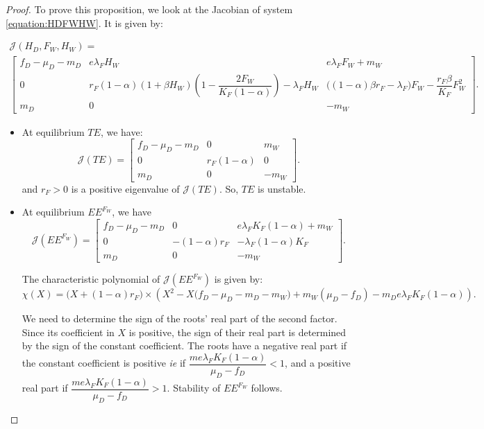 \documentclass{article}
\newcommand{\lfw}{\lambda_{F}}
\newcommand{\lfw}{\lambda_{F}}
\begin{document}
\begin{proof}
To prove this proposition, we look at the Jacobian of system \eqref{equation:HDFWHW}. It is given by:

\begin{multline}
\mathcal{J}(H_D, F_W, H_W) = \\
\begin{bmatrix}
f_D-\mu_D - m_D & e \lfw H_W & e\lfw F_W + m_W \\
0 & r_F(1-\alpha)(1+\beta H_W) \left( 1 - \dfrac{2F_W}{K_F(1-\alpha)} \right) - \lfw H_W & \Big((1-\alpha)\beta r_F - \lfw \Big) F_W -  \dfrac{r_F\beta}{K_F} F_W^2\\
m_D & 0 & -m_W
\end{bmatrix}.
\label{equation: jacobianMatrix}
\end{multline}

\begin{itemize}
\item At equilibrium $TE$, we have:
\begin{equation*}
\mathcal{J}(TE) = \begin{bmatrix}
f_D-\mu_D - m_D & 0 &  m_W \\
0 & r_F(1-\alpha)  &  0\\
m_D & 0 & -m_W
\end{bmatrix}.
\end{equation*}
and $r_F > 0$ is a positive eigenvalue of $\mathcal{J}(TE)$. So, $TE$ is unstable.
\item At equilibrium $EE^{F_W}$, we have
\begin{equation*}
\mathcal{J}(EE^{F_W}) = \begin{bmatrix}
f_D-\mu_D - m_D & 0 & e\lfw K_F(1-\alpha) + m_W \\
0 & -(1-\alpha)r_F  & -\lfw(1-\alpha)K_F  \\
m_D & 0 & -m_W
\end{bmatrix}.
\end{equation*}

The characteristic polynomial of $\mathcal{J}(EE^{F_W})$ is given by:
\begin{equation*}
\chi(X) = \big(X +(1-\alpha)r_F\big) \times \left(X^2 - X\Big(f_D - \mu_D - m_D - m_W \Big) + m_W(\mu_D - f_D) - m_D e \lfw K_F(1-\alpha) \right).
\end{equation*}

We need to determine the sign of the roots' real part of the second factor. Since its coefficient in $X$ is positive, the sign of their real part is determined by the sign of the constant coefficient.
The roots have a negative real part if the constant coefficient is positive \textit{ie} if $\dfrac{m e \lfw K_F(1-\alpha)}{\mu_D - f_D} < 1 $, and a positive real part if $\dfrac{m e \lfw K_F(1-\alpha)}{\mu_D - f_D} > 1 $. Stability of $EE^{F_W}$ follows.


\end{itemize}
\end{proof}
\end{document}
